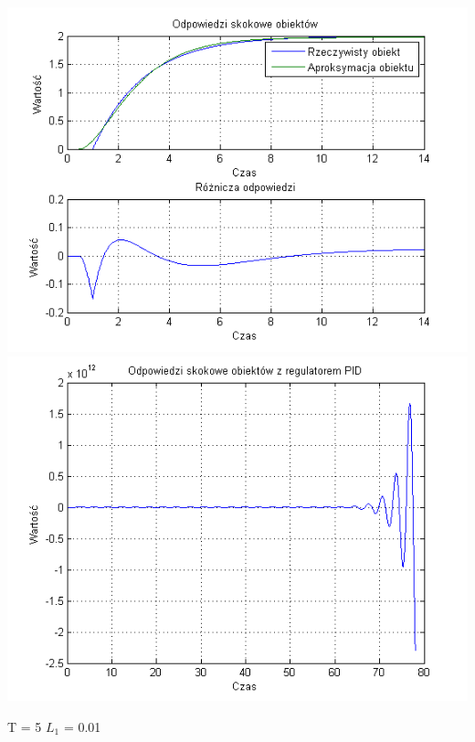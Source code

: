 \documentclass[10pt,a4paper]{article}
\begin{document}
\begin{center}
\includegraphics[scale=1]{images/dwa/skrypt_187.png}\\
\includegraphics[scale=1]{images/dwa/skrypt_188.png}\\
\end{center}
\newpage
T = 5
$L_1$ = 0.01
\end{document}
